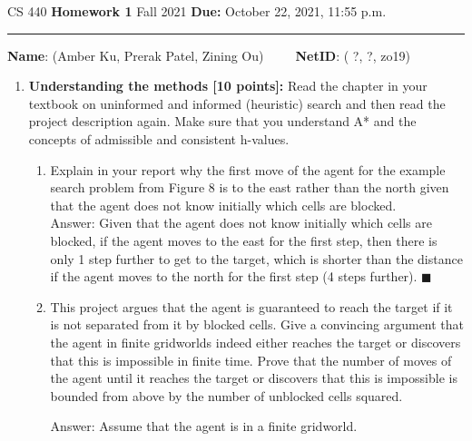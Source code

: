 \documentclass[12pt]{article}
\begin{document}
\noindent
CS 440 \hfill \textbf{Homework 1} \newline 
{Fall 2021} \hfill \textbf{Due:} October 22, 2021, 11:55 p.m.

\noindent
\rule{\linewidth}{0.4pt}

\vspace{.5cm}

\textbf{Name}: ({\color{blue}Amber Ku, Prerak Patel, Zining Ou})~~~~~\textbf{NetID}: ({\color{blue} ?, ?, zo19})

\vspace{.5cm}



\begin{enumerate}

  \item \textbf{Understanding the methods [10 points]:} Read the chapter in your textbook on uninformed and informed (heuristic) search and then read the project description again. Make sure that you understand A* and the concepts of admissible and consistent h-values.
  \begin{enumerate}
  	\item Explain in your report why the first move of the agent for the example search problem from Figure 8 is to the east rather than the north given that the agent does not know initially which cells are blocked. \\
	
	{\color{blue}Answer: 
	Given that the agent does not know initially which cells are blocked, if the agent moves to the east for the first step, then there is only 1 step further to get to the target, which is shorter than the distance if the agent moves to the north for the first step (4 steps further).
	$\blacksquare$
	\\
	}

	\item This project argues that the agent is guaranteed to reach the target if it is not separated from it by blocked cells. Give a convincing argument that the agent in finite gridworlds indeed either reaches the target or discovers that this is impossible in finite time. Prove that the number of moves of the agent until it reaches the target or discovers that this is impossible is bounded from above by the number of unblocked cells squared.\\
		
	{\color{blue}Answer: 
	Assume that the agent is in a finite gridworld.
	
}
\end{enumerate}
\end{enumerate}
\end{document}
